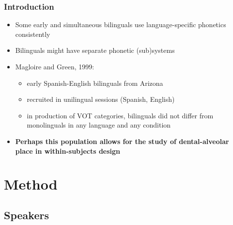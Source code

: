 \documentclass{beamer}
\begin{document}
\begin{frame}
\frametitle{Introduction}
\begin{itemize}
	\item Some early and simultaneous bilinguals use language-specific phonetics consistently
	\item Bilinguals might have separate phonetic (sub)systems
	\item Magloire and Green, 1999:
	\begin{itemize}
		\item early Spanish-English bilinguals from Arizona
		\item recruited in unilingual sessions (Spanish, English)
		\item in production of VOT categories, bilinguals did not differ from monolinguals in any language and any condition
	\end{itemize}
	\item \textbf{Perhaps this population allows for the study of dental-alveolar place in within-subjects design}
\end{itemize}
\end{frame}


\section{Method} %
\label{sec:method}
\subsection{Speakers}


\end{document}

